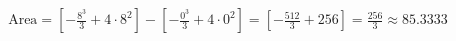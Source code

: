 \documentclass[preview]{standalone}
\begin{document}
\begin{align*}
\text{Area} = \left[-\frac{8^3}{3} + 4 \cdot 8^2\right] - \left[-\frac{0^3}{3} + 4 \cdot 0^2\right] = \left[-\frac{512}{3} + 256\right] = \frac{256}{3} \approx 85.3333
\end{align*}
\end{document}
